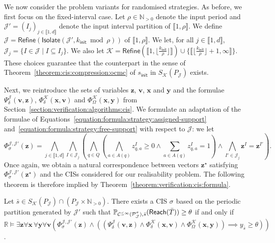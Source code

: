 \documentclass[a4paper,UKenglish,cleveref,autoref,thm-restate,colorlinks]{lipics-v2021}
\newcommand{\init}{\mathsf{init}}
\newcommand{\integerInterval}[1]{\llbracket{}#1\rrbracket{}}
\newcommand{\IR}{\mathbb{R}}
\newcommand{\IN}{\mathbb{N}}
\newcommand{\INpos}{\IN_{>0}}
\newcommand{\mdpStateSpace}{S}
\newcommand{\ocStateSpace}{Q}
\newcommand{\ocState}{q}
\newcommand{\ocCount}{k}
\newcommand{\ocConfig}{s}
\newcommand{\ocActionSpace}{A}
\newcommand{\ocAction}{a}
\newcommand{\ocTrans}{\delta}
\newcommand{\period}{\rho}
\newcommand{\mchain}{\mathcal{C}}
\newcommand{\ocChain}{\mathcal{P}}
\newcommand{\ocChainFin}[2]{\mchain^{\leq #2}(#1)}
\newcommand{\intPartB}{\mathcal{J}}
\newcommand{\intPartC}{\mathcal{K}}
\newcommand{\interval}{I}
\newcommand{\intNum}{d}
\newcommand{\intIndex}{j}
\newcommand{\cisChainStrat}[1]{\ocChain^{#1}_{\intPartB}}
\newcommand{\cisChain}{\cisChainStrat{\strat}}
\newcommand{\cisChainStateSpace}{P_{\intPartB}}
\newcommand{\compressCisStateSpace}{\mdpStateSpace_{\intPartC}({\cisChainStateSpace})}
\newcommand{\cisConfig}{\bar{\ocConfig}}
\newcommand{\varTrans}{x}
\newcommand{\varTransTuple}{\mathbf{\varTrans}}
\newcommand{\varObj}{y}
\newcommand{\varObjTuple}{\mathbf{\varObj}}
\newcommand{\varStrat}{z}
\newcommand{\varStratI}{\mathbf{\varStrat}^{\interval}}
\newcommand{\varStratIprime}{\mathbf{\varStrat}^{\interval'}}
\newcommand{\varStratTuple}{\mathbf{\varStrat}}
\newcommand{\solStratTuple}{\mathbf{\varStrat}^{\star}}
\newcommand{\varCis}{v}
\newcommand{\varCisTuple}{\mathbf{\varCis}}
\newcommand{\formulaTransBase}{\Phi_{\ocTrans}}
\newcommand{\formulaObjBase}{\Phi_{\objective}}
\newcommand{\formulaCisBase}{\Psi_{\ocTrans}}
\newcommand{\formulaStratBase}{\Phi_{\strat}}
\newcommand{\formulaCis}{\formulaCisBase^\intPartB}
\newcommand{\formulaCisTrans}{\formulaTransBase^\intPartC}
\newcommand{\formulaCisObj}{\formulaObjBase^\intPartC}
\newcommand{\formulaStratCis}{\formulaStratBase^{\intPartB,\intPartB'}}
\newcommand{\objective}{\Omega}
\newcommand{\reach}[1]{\mathsf{Reach}(#1)}
\newcommand{\target}{T}
\newcommand{\thresProba}{\theta}
\newcommand{\stratGeneric}[1]{{\sigma_{#1}}}
\newcommand{\strat}{\stratGeneric{}}
\begin{document}
We now consider the problem variants for randomised strategies.
As before, we first focus on the fixed-interval case.
Let $\period\in\INpos$ denote the input period and $\intPartB' = (\interval_{\intIndex})_{\intIndex\in\integerInterval{1, \intNum}}$ denote the input interval partition of $\integerInterval{1, \period}$.
We  define $\intPartB=\mathsf{Refine}(\mathsf{Isolate}(\intPartB', \ocCount_\init\bmod\period))$ of $\integerInterval{1, \period}$.
We let, for all $\intIndex\in\integerInterval{1, \intNum}$, $\intPartB_\intIndex = \{\interval\in\intPartB\mid\interval\subseteq\interval_\intIndex\}$.
We also let $\intPartC = \mathsf{Refine}(\integerInterval{1, \lfloor\frac{\ocCount_\init}{\period}\rfloor})\cup\{\integerInterval{\lfloor\frac{\ocCount_\init}{\period}\rfloor+1, \infty}\}$.
These choices guarantee that the counterpart in the sense of Theorem~\ref{theorem:cis:compression:ocmc} of $\ocConfig_\init$ in $\compressCisStateSpace$ exists.

Next, we reintroduce the sets of variables $\varStratTuple$, $\varCisTuple$, $\varTransTuple$ and $\varObjTuple$ and the formulae $\formulaCis(\varCisTuple, \varStratTuple)$, $\formulaCisTrans(\varTransTuple, \varCisTuple)$ and $\formulaCisObj(\varTransTuple, \varObjTuple)$ from Section~\ref{section:verification:algorithms:cis}.
We formulate an adaptation of the formulae of Equations~\eqref{equation:formula:strategy:assigned-support} and~\eqref{equation:formula:strategy:free-support} with respect to $\intPartB$: we let
\begin{equation}
  \formulaStratCis(\varStratTuple) =
  \bigwedge_{\intIndex\in\integerInterval{1, \intNum}}
  \bigwedge_{\interval\in\intPartB_\intIndex}
  \left(
  \bigwedge_{\ocState\in\ocStateSpace}\left(
    \bigwedge_{\ocAction\in\ocActionSpace(\ocState)}
      \varStrat_{\ocState,\ocAction}^{\interval} \geq 0\land
      \sum_{\ocAction\in\ocActionSpace(\ocState)}\varStrat_{\ocState,\ocAction}^{\interval} = 1
    \right)\land
    \bigwedge_{\interval'\in\intPartB_\intIndex}
    \varStratI = \varStratIprime
  \right).
\end{equation}
Once again, we obtain a natural correspondence between vectors $\solStratTuple$ satisfying $\formulaStratCis(\solStratTuple)$ and the CISs considered for our realisability problem.
The following theorem is therefore implied by Theorem~\ref{theorem:verification:cis:formula}.
\begin{theorem}\label{theorem:synthesis:cis:formula}
  Let $\cisConfig\in\compressCisStateSpace\cap(\cisChainStateSpace\times\INpos)$.
  There exists a CIS $\strat$ based on the periodic partition generated by $\intPartB'$ such that $\probaMCverb{\ocChainFin{\cisChain}{\infty}}{\cisConfig}(\reach{\bar{\target}})\geq\thresProba$ if and only if $\IR\models\exists\varStratTuple\forall\varTransTuple\,\forall\varObjTuple\forall\varCisTuple (\formulaStratCis(\varStratTuple)\land ((\formulaCis(\varCisTuple, \varStratTuple)\land\formulaCisTrans(\varTransTuple,\varCisTuple)\land\formulaCisObj(\varTransTuple, \varObjTuple))\implies \varObj_{\cisConfig}\geq\thresProba))$.
\end{theorem}
\end{document}
